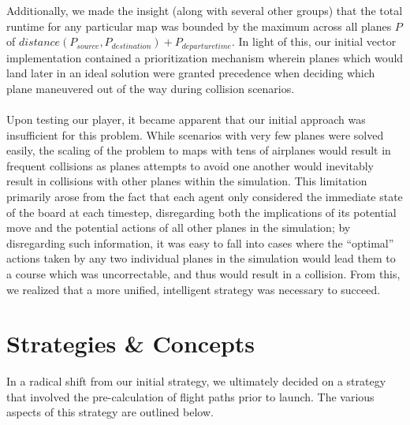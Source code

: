\documentclass[10pt]{article}
\begin{document}
Additionally, we made the insight (along with several other groups) that the total runtime for
any particular map was bounded by the maximum across all planes $P$ of $distance(P_{source}, 
P_{destination}) + P_{departure time}$. In light of this, our initial vector implementation 
contained a prioritization mechanism wherein planes which would land later in an ideal solution
were granted precedence when deciding which plane maneuvered out of the way during collision 
scenarios.\\\\
Upon testing our player, it became apparent that our initial approach was insufficient for this
problem. While scenarios with very few planes were solved easily, the scaling of the problem to
maps with tens of airplanes would result in frequent collisions as planes attempts to avoid one
another would inevitably result in collisions with other planes within the simulation. This 
limitation primarily arose from the fact that each agent only considered the immediate state
of the board at each timestep, disregarding both the implications of its potential move and
the potential actions of all other planes in the simulation; by disregarding such information,
it was easy to fall into cases where the ``optimal'' actions taken by any two individual planes 
in the simulation would lead them to a course which was uncorrectable, and thus would result in
a collision. From this, we realized that a more unified, intelligent strategy was necessary to
succeed.

\newpage
\section{Strategies \& Concepts}
In a radical shift from our initial strategy, we ultimately decided on a strategy that involved
the pre-calculation of flight paths prior to launch. The various aspects of this strategy are 
outlined below.
\end{document}
